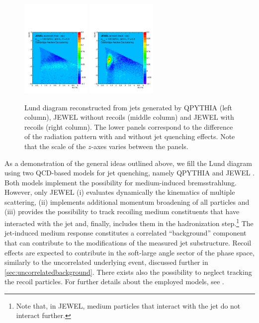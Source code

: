 \begin{figure}[h]
\includegraphics[width=0.3\textwidth]{figures/LundMC/FinalPlots/Jewel_Diff_RecoilOff.pdf}
\includegraphics[width=0.3\textwidth]{figures/LundMC/FinalPlots/Jewel_Diff_RecoilOn.pdf}
\caption{Lund diagram reconstructed from jets generated by QPYTHIA (left column), JEWEL without recoils (middle column) and JEWEL with recoils (right column).
The lower panels correspond to the difference of the radiation pattern with and without jet quenching effects. Note that the scale of the $z$-axes varies between the panels.}
\label{fig:PS2}
\end{figure}
As a demonstration of the general ideas outlined above, we fill the Lund diagram using 
two QCD-based models for jet quenching, namely QPYTHIA \cite{Armesto:2009fj} and JEWEL \cite{Zapp:2011ya,Zapp:2012ak}. 
Both models implement the possibility for medium-induced bremsstrahlung. However, only JEWEL (i) evaluates dynamically the kinematics of multiple scattering, (ii) implements additional momentum broadening of all particles and (iii) provides the possibility to track recoiling medium constituents that have interacted with the jet and, finally, includes them in the hadronization step.\footnote{Note that, in JEWEL, medium particles that interact with the jet do not interact further.} 
The jet-induced medium response constitutes a correlated ``background'' component that can contribute to the modifications of the measured jet substructure. Recoil effects are expected to contribute in the soft-large angle sector of the phase space, similarly to the uncorrelated underlying event, discussed further in \autoref{sec:uncorrelatedbackground}.
There exists also the possibility to neglect tracking the recoil particles.
For further details about the employed models, see .

